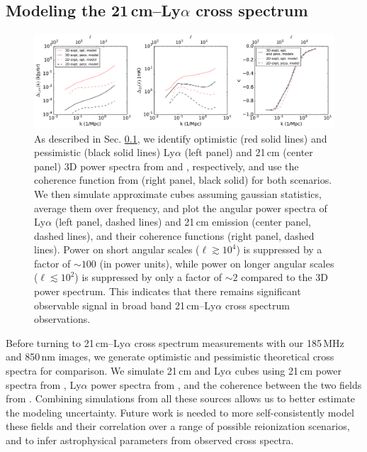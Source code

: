 \documentclass[numberedappendix]{emulateapj}
\begin{document}
\subsection{Modeling the 21\,cm--Ly$\alpha$ cross spectrum}
\label{sec:modelingthecrossspectrum}

\begin{figure}[h]
\centering
\includegraphics[width=7in]{chap5_xcor/spectra3D_to_2D.pdf}
\caption{As described in Sec. \ref{sec:modelingthecrossspectrum}, we identify optimistic (red solid lines) and pessimistic (black solid lines) Ly$\alpha$ (left panel) and 21\,cm (center panel) 3D power spectra from \citet{Gong2014} and \citet{PoberNextGen}, respectively, and use the coherence function from \citet{Heneka2016} (right panel, black solid) for both scenarios. We then simulate approximate cubes assuming gaussian statistics, average them over frequency, and plot the angular power spectra of Ly$\alpha$ (left panel, dashed lines) and 21\,cm emission (center panel, dashed lines), and their coherence functions (right panel, dashed lines). Power on short angular scales ($\ell\gtrsim10^4$) is suppressed by a factor of $\sim100$ (in power units), while power on longer angular scales ($\ell\lesssim10^2$) is suppressed by only a factor of $\sim2$ compared to the 3D power spectrum. This indicates that there remains significant observable signal in broad band 21\,cm--Ly$\alpha$ cross spectrum observations. }
\label{fig:spectra3Dto2D}
\end{figure}

Before turning to 21\,cm--Ly$\alpha$ cross spectrum measurements with our 185\,MHz and 850\,nm images, we generate optimistic and pessimistic theoretical cross spectra for comparison. We simulate 21\,cm and Ly$\alpha$ cubes using 21\,cm power spectra from \citet{PoberNextGen}, Ly$\alpha$ power spectra from \citet{Gong2014}, and the coherence between the two fields from \citet{Heneka2016}. Combining simulations from all these sources allows us to better estimate the modeling uncertainty. Future work is needed to more self-consistently model these fields and their correlation over a range of possible reionization scenarios, and to infer astrophysical parameters from observed cross spectra.
\end{document}
